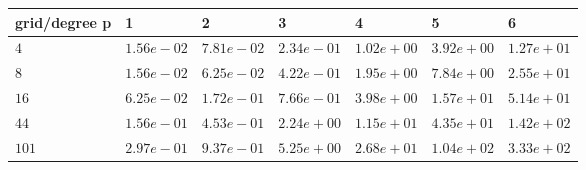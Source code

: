 \begin{tabular}{lllllll}
\hline
 grid/degree p   & 1          & 2          & 3          & 4          & 5          & 6          \\
\hline
 $4$             & $1.56e-02$ & $7.81e-02$ & $2.34e-01$ & $1.02e+00$ & $3.92e+00$ & $1.27e+01$ \\
 $8$             & $1.56e-02$ & $6.25e-02$ & $4.22e-01$ & $1.95e+00$ & $7.84e+00$ & $2.55e+01$ \\
 $16$            & $6.25e-02$ & $1.72e-01$ & $7.66e-01$ & $3.98e+00$ & $1.57e+01$ & $5.14e+01$ \\
 $44$            & $1.56e-01$ & $4.53e-01$ & $2.24e+00$ & $1.15e+01$ & $4.35e+01$ & $1.42e+02$ \\
 $101$           & $2.97e-01$ & $9.37e-01$ & $5.25e+00$ & $2.68e+01$ & $1.04e+02$ & $3.33e+02$ \\
\hline
\end{tabular}